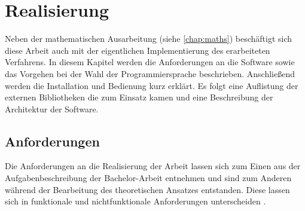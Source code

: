 \chapter{Realisierung}
\label{chap:impl}
Neben der mathematischen Ausarbeitung (siehe \autoref{chap:maths}) beschäftigt sich diese Arbeit auch mit der eigentlichen Implementierung des erarbeiteten Verfahrens. In diesem Kapitel werden die Anforderungen an die Software sowie das Vorgehen bei der Wahl der Programmiersprache beschrieben. Anschließend werden die Installation und Bedienung kurz erklärt. Es folgt eine Auflistung der externen Bibliotheken die zum Einsatz kamen und eine Beschreibung der Architektur der Software.

\section{Anforderungen}
Die Anforderungen an die Realisierung der Arbeit lassen sich zum Einen aus der Aufgabenbeschreibung der Bachelor-Arbeit entnehmen und sind zum Anderen während der Bearbeitung des theoretischen Ansatzes entstanden. Diese lassen sich in funktionale und nichtfunktionale Anforderungen unterscheiden  \cite[S. 369f]{ludewig}.
